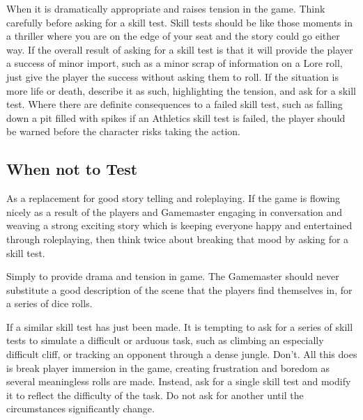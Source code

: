 When it is dramatically appropriate and raises tension in the game. Think carefully before asking for a skill test. Skill tests should be like those moments in a thriller where you are on the edge of your seat and the story could go either way. If the overall result of asking for a skill test is that it will provide the player a success of minor import, such as a minor scrap of information on a Lore roll, just give the player the success without asking them to roll. If the situation is more life or death, describe it as such, highlighting the tension, and ask for a skill test. Where there are definite consequences to a failed skill test, such as falling down a pit filled with spikes if an Athletics skill test is failed, the player should be warned before the character risks taking the action.

\subsection{When not to Test}
As a replacement for good story telling and roleplaying. If the game is flowing nicely as a result of the players and Gamemaster engaging in conversation and weaving a strong exciting story which is keeping everyone happy and entertained through roleplaying, then think twice about breaking that mood by asking for a skill test.

Simply to provide drama and tension in game. The Gamemaster should never substitute a good description of the scene that the players find themselves in, for a series of dice rolls.  

If a similar skill test has just been made. It is tempting to ask for a series of skill tests to simulate a difficult or arduous task, such as climbing an especially difficult cliff, or tracking an opponent through a dense jungle. Don’t. All this does is break player immersion in the game, creating frustration and boredom as several meaningless rolls are made. Instead, ask for a single skill test and modify it to reflect the difficulty of the task. Do not ask for another until the circumstances significantly change.


